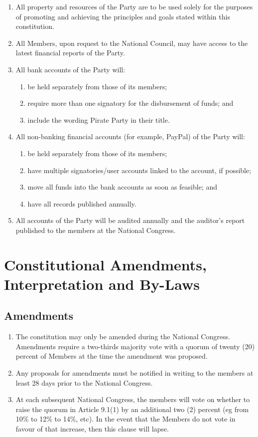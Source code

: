 \documentclass[a4paper,titlepage,8.5pt]{article}
\begin{document}
\begin{enumerate}
\item All property and resources of the Party are to be used solely for the purposes of promoting and achieving the principles and goals stated within this constitution.
\item All Members, upon request to the National Council, may have access to the latest financial reports of the Party.
\item All bank accounts of the Party will:
\begin{enumerate}
\item be held separately from those of its members;
\item require more than one signatory for the disbursement of funds; and
\item include the wording Pirate Party in their title.
\end{enumerate}
\item All non-banking financial accounts (for example, PayPal) of the Party will:
\begin{enumerate}
\item be held separately from those of its members;
\item have multiple signatories/user accounts linked to the account, if possible;
\item move all funds into the bank accounts as soon as feasible; and
\item have all records published annually.
\end{enumerate}
\item All accounts of the Party will be audited annually and the auditor’s report published to the members at the National Congress.
\end{enumerate}

\section{Constitutional Amendments, Interpretation and By-Laws}

\subsection{Amendments}

\begin{enumerate}
\item The constitution may only be amended during the National Congress. Amendments require a two-thirds majority vote with a quorum of twenty (20) percent of Members at the time the amendment was proposed.
\item Any proposals for amendments must be notified in writing to the members at least 28 days prior to the National Congress.
\item At each subsequent National Congress, the members will vote on whether to raise the quorum in Article 9.1(1) by an additional two (2) percent (eg from 10\% to 12\% to 14\%, etc). In the event that the Members do not vote in favour of that increase, then this clause will lapse.
\end{enumerate}
\end{document}
